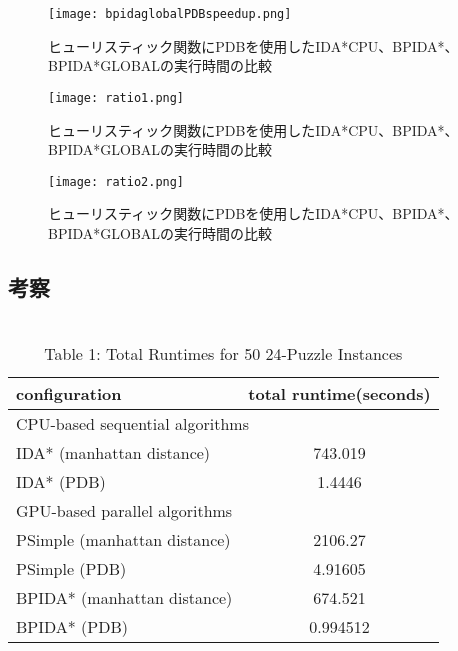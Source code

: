 \documentclass[a4paper,11pt,oneside,openany]{jsbook}
\begin{document}
\begin{figure}[hbtp]
\begin{center}
\texttt{[image: bpidaglobalPDBspeedup.png]}
\caption{ヒューリスティック関数にPDBを使用したIDA*CPU、BPIDA*、BPIDA*GLOBALの実行時間の比較}
\end{center}
\end{figure}


\begin{figure}[hbtp]
\begin{center}
\texttt{[image: ratio1.png]}
\caption{ヒューリスティック関数にPDBを使用したIDA*CPU、BPIDA*、BPIDA*GLOBALの実行時間の比較}
\end{center}
\end{figure}

\begin{figure}[hbtp]
\begin{center}
\texttt{[image: ratio2.png]}
\caption{ヒューリスティック関数にPDBを使用したIDA*CPU、BPIDA*、BPIDA*GLOBALの実行時間の比較}
\end{center}
\end{figure}

\subsection{考察}

\section{}









\begin{table}[]
\centering
\caption{Table 1: Total Runtimes for 50 24-Puzzle Instances}
\label{my-label}
\begin{tabular}{|l|c|}
\hline
configuration & \multicolumn{1}{l|}{total runtime(seconds)} \\ \hline
\multicolumn{2}{|l|}{CPU-based sequential algorithms} \\ \hline
IDA* (manhattan distance) & 743.019 \\
IDA* (PDB) & 1.4446 \\ \hline
\multicolumn{2}{|l|}{GPU-based parallel algorithms} \\ \hline
PSimple (manhattan distance) & 2106.27 \\
PSimple (PDB) & 4.91605 \\
BPIDA* (manhattan distance) & 674.521 \\
BPIDA* (PDB) & 0.994512 \\ \hline
\end{tabular}
\end{table}
\end{document}
